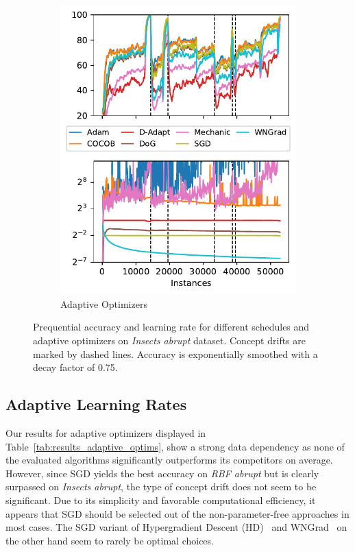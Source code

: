 \documentclass{article} %
\begin{document}
\begin{figure}[ht]
\begin{subfigure}[b]{0.99\textwidth - \asize}
      \includegraphics[width=\textwidth]{figures/lr_norms_optims_insects_abrupt.pdf}
      \caption{Adaptive Optimizers}
      \label{fig:prequential_optims_insects}
   \end{subfigure}
   \caption{Prequential accuracy and learning rate for different schedules and adaptive optimizers on \textit{Insects abrupt} dataset. Concept drifts are marked by dashed lines. Accuracy is exponentially smoothed with a decay factor of 0.75.}
\end{figure}

\subsection{Adaptive Learning Rates}

Our results for adaptive optimizers displayed in Table~\ref{tab:results_adaptive_optims}, show a strong data dependency as none of the evaluated algorithms significantly outperforms its competitors on average.
However, since SGD yields the best accuracy on \textit{RBF abrupt} but is clearly surpassed on \textit{Insects abrupt}, the type of concept drift does not seem to be significant.
Due to its simplicity and favorable computational efficiency, it appears that SGD should be selected out of the non-parameter-free approaches in most cases.
The SGD variant of Hypergradient Descent (HD)~\citep{baydinOnlineLearningRate2018} and WNGrad~\citep{wuWNGradLearnLearning2020} on the other hand seem to rarely be optimal choices.
\end{document}

